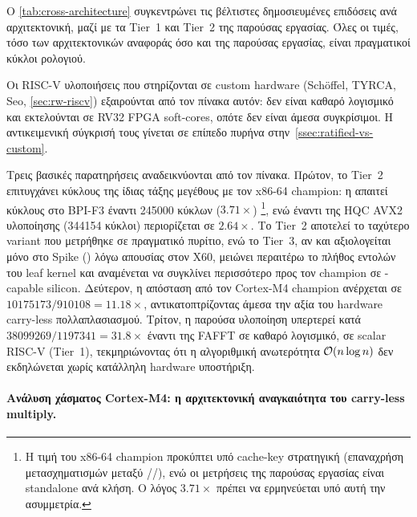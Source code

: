 Ο \cref{tab:cross-architecture} συγκεντρώνει τις βέλτιστες δημοσιευμένες
επιδόσεις  ανά αρχιτεκτονική, μαζί με τα Tier~1 και Tier~2 της παρούσας
εργασίας. Όλες οι τιμές, τόσο των
αρχιτεκτονικών αναφοράς όσο και της παρούσας εργασίας, είναι πραγματικοί
κύκλοι ρολογιού.

Οι RISC-V υλοποιήσεις που στηρίζονται σε custom hardware (Schöffel, TYRCA,
Seo, \cref{sec:rw-riscv}) εξαιρούνται από τον πίνακα αυτόν: δεν είναι καθαρό
λογισμικό και εκτελούνται σε RV32 FPGA soft-cores, οπότε
δεν είναι άμεσα συγκρίσιμοι. Η αντικειμενική σύγκρισή τους γίνεται σε επίπεδο
πυρήνα στην~\cref{ssec:ratified-vs-custom}.

\begin{table}[htbp]
  \centering
  \caption{Συγκριτική αξιολόγηση  \KEM.}%
  \label{tab:cross-architecture}
  \small
  
\end{table}

Τρεις βασικές παρατηρήσεις αναδεικνύονται από τον πίνακα. Πρώτον, το
Tier~2 επιτυγχάνει κύκλους της ίδιας τάξης
μεγέθους με τον x86-64 champion: η \Decaps απαιτεί 
κύκλους στο BPI-F3 έναντι \num{245000} κύκλων ($3.71\times$)%
\footnote{Η τιμή \Decaps του x86-64 champion
προκύπτει υπό cache-key στρατηγική (επαναχρήση μετασχηματισμών
μεταξύ \KeyGen/\Encaps/\Decaps), ενώ οι μετρήσεις της παρούσας
εργασίας είναι standalone ανά κλήση. Ο λόγος $3.71\times$ πρέπει να
ερμηνεύεται υπό αυτή την ασυμμετρία.}, ενώ έναντι της HQC AVX2
υλοποίησης (\num{344154} κύκλοι) περιορίζεται σε $2.64\times$. Το Tier~2 
αποτελεί το ταχύτερο variant που μετρήθηκε σε πραγματικό πυρίτιο, ενώ 
το Tier~3, αν και αξιολογείται μόνο στο Spike (\instret) λόγω 
απουσίας \Zvbc στον X60, μειώνει περαιτέρω το πλήθος εντολών του leaf 
kernel και αναμένεται να συγκλίνει περισσότερο προς τον champion σε 
\Zvbc-capable silicon. Δεύτερον, η απόσταση από τον Cortex-M4 champion
ανέρχεται σε $\num{10175173} / \num{910108} = 11.18\times$, αντικατοπτρίζοντας
άμεσα την αξία του hardware carry-less πολλαπλασιασμού. Τρίτον, η παρούσα
υλοποίηση υπερτερεί κατά $\num{38099269} / \num{1197341} = 31.8\times$ έναντι
της FAFFT σε καθαρό λογισμικό, σε scalar RISC-V (Tier~1), τεκμηριώνοντας ότι η αλγοριθμική
ανωτερότητα $\mathcal{O}(n \log n)$ δεν εκδηλώνεται χωρίς κατάλληλη hardware
υποστήριξη.

\paragraph{Ανάλυση χάσματος Cortex-M4: η αρχιτεκτονική αναγκαιότητα του carry-less multiply.}
\label{ssec:cortex-m4-gap}

